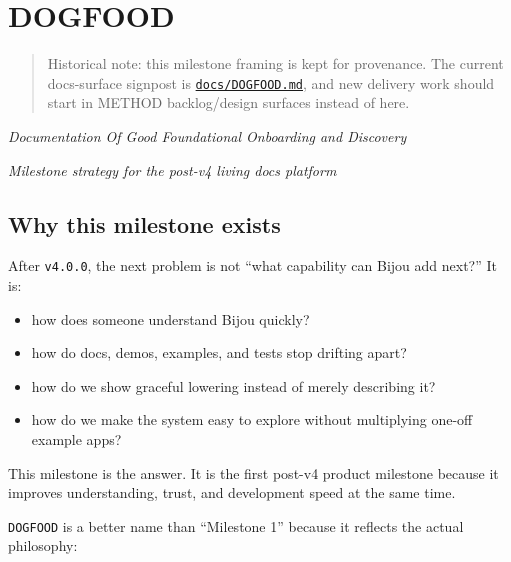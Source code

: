 \chapter{DOGFOOD}\label{record-042}

\smallskip

\begin{quote}
Historical note: this milestone framing is kept for provenance. The current docs-surface signpost is \href{https://github.com/flyingrobots/bijou/blob/cbd70612140e7a450d764b3c7be1c6af878b99bc/docs/DOGFOOD.md}{\texttt{d\allowbreak{}o\allowbreak{}c\allowbreak{}s\allowbreak{}/\allowbreak{}D\allowbreak{}O\allowbreak{}G\allowbreak{}F\allowbreak{}O\allowbreak{}O\allowbreak{}D\allowbreak{}.\allowbreak{}m\allowbreak{}d}}, and new delivery work should start in METHOD backlog/design surfaces instead of here.
\end{quote}

\emph{Documentation Of Good Foundational Onboarding and Discovery}

\emph{Milestone strategy for the post-v4 living docs platform}

\section{Why this milestone exists}\label{record-042-why-this-milestone-exists}

After \texttt{v\allowbreak{}4\allowbreak{}.\allowbreak{}0\allowbreak{}.\allowbreak{}0}, the next problem is not ``what capability can Bijou add next?'' It is:

\begin{itemize}
\tightlist
\item
  how does someone understand Bijou quickly?
\item
  how do docs, demos, examples, and tests stop drifting apart?
\item
  how do we show graceful lowering instead of merely describing it?
\item
  how do we make the system easy to explore without multiplying one-off example apps?
\end{itemize}

This milestone is the answer. It is the first post-v4 product milestone because it improves understanding, trust, and development speed at the same time.

\texttt{D\allowbreak{}O\allowbreak{}G\allowbreak{}F\allowbreak{}O\allowbreak{}O\allowbreak{}D} is a better name than ``Milestone 1'' because it reflects the actual philosophy:

